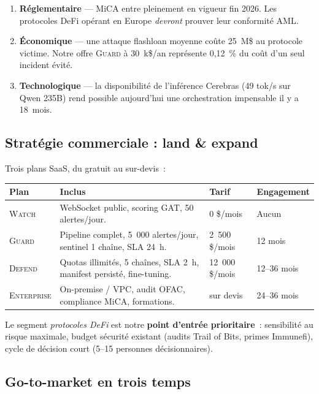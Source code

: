 \documentclass[11pt,a4paper]{article}
\begin{document}
\begin{enumerate}
  \item \textbf{Réglementaire} --- MiCA entre pleinement en vigueur fin
        2026. Les protocoles DeFi opérant en Europe \emph{devront}
        prouver leur conformité AML.
  \item \textbf{Économique} --- une attaque flashloan moyenne coûte
        25~M\$ au protocole victime. Notre offre \textsc{Guard} à
        30~k\$/an représente 0,12~\% du coût d'un seul incident
        évité.
  \item \textbf{Technologique} --- la disponibilité de l'inférence
        Cerebras (49 tok/s sur Qwen 235B) rend possible aujourd'hui
        une orchestration impensable il y a 18~mois.
\end{enumerate}

\subsection{Stratégie commerciale : land \& expand}

Trois plans SaaS, du gratuit au sur-devis~:

\begin{tabularx}{\linewidth}{@{}lXll@{}}
\toprule
\textbf{Plan} & \textbf{Inclus} & \textbf{Tarif} & \textbf{Engagement} \\
\midrule
\textsc{Watch} &
WebSocket public, scoring GAT, 50 alertes/jour. & 0 \$/mois & Aucun \\
\addlinespace
\textsc{Guard} &
Pipeline complet, 5~000 alertes/jour, sentinel 1 chaîne, SLA 24~h. &
2~500 \$/mois & 12 mois \\
\addlinespace
\textsc{Defend} &
Quotas illimités, 5 chaînes, SLA 2~h, manifest persisté, fine-tuning. &
12~000 \$/mois & 12--36 mois \\
\addlinespace
\textsc{Enterprise} &
On-premise / VPC, audit OFAC, compliance MiCA, formations. &
sur devis & 24--36 mois \\
\bottomrule
\end{tabularx}

\medskip

Le segment \emph{protocoles DeFi} est notre \textbf{point d'entrée
prioritaire}~: sensibilité au risque maximale, budget sécurité existant
(audits Trail of Bits, primes Immunefi), cycle de décision court (5--15
personnes décisionnaires).

\subsection{Go-to-market en trois temps}
\end{document}
